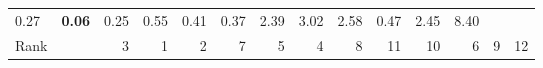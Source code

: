 \begin{tabular}{ll|rrrrrrrrr|rrr}
  


  
  0.27 & \textbf{0.06} & 0.25 & 0.55 & 0.41 & 0.37 & 2.39 & 3.02 & 2.58 & 0.47 & 2.45 & 8.40 \\

  Rank & &
  3 & 1 & 2 & 7 & 5 & 4 & 8 & 11 & 10 & 6 & 9 & 12 \\\hline\hline
           

\end{tabular}
